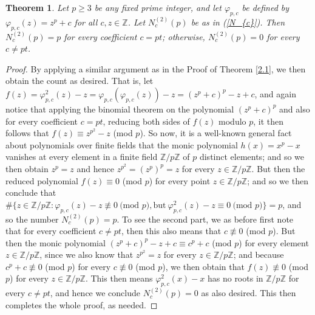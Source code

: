 \documentclass{article}
\theoremstyle{plain}
\newtheorem{thm}{Theorem}[section]
\theoremstyle{definition}
\begin{document}
\begin{thm} \label{2.2}
Let $p\geq 3$ be any fixed prime integer, and let $\varphi_{p, c}$ be defined by $\varphi_{p, c}(z) = z^p+c$ for all $c, z\in\mathbb{Z}$. Let $N_{c}^{(2)}(p)$ be as in \textnormal{(\ref{N_{c}})}. Then $N_{c}^{(2)}(p)=p$ for every coefficient $c = pt$; otherwise, $N_{c}^{(2)}(p) = 0$ for every $c \neq  pt$.
\end{thm}
\begin{proof}
By applying a similar argument as in the Proof of Theorem \ref{2.1}, we then obtain the count as desired. That is, let $f(z)= \varphi_{p, c}^2(z)-z = \varphi_{p,c}(\varphi_{p,c}(z))-z = (z^p+c)^p - z + c$, and again notice that applying the binomial theorem on the polynomial $(z^p + c)^p$ and also for every coefficient $c = pt$, reducing both sides of $f(z)$ modulo $p$, it then follows that $f(z)\equiv z^{p^2} - z$ (mod $p$). So now, it is a well-known general fact about polynomials over finite fields that the monic polynomial $h(x)= x^p - x$ vanishes at every element in a finite field $\mathbb{Z}\slash p\mathbb{Z}$ of $p$ distinct elements; and so we then obtain $z^p = z$ and hence $z^{p^2} = (z^p)^p = z$ for every $z\in \mathbb{Z}\slash p\mathbb{Z}$. But then the reduced polynomial $f(z)\equiv 0$ (mod $p$) for every point $z\in \mathbb{Z}\slash p\mathbb{Z}$; and so we then conclude that $\#\{ z\in \mathbb{Z} / p\mathbb{Z}: \varphi_{p,c}(z) -z \not \equiv 0 \ \text{(mod $p$)},\text{but} \ \varphi_{p,c}^2(z) - z \equiv 0 \ \text{(mod $p$)}\} =p$, and so the number $N_{c}^{(2)}(p)=p$. To see the second part, we as before first note that for every coefficient $c\neq pt$, then this also means that $c\not \equiv 0$ (mod $p$). But then the monic polynomial $(z^p+c)^p - z + c\equiv c^p + c$ (mod $p$) for every element $z\in \mathbb{Z} / p\mathbb{Z}$, since we also know that $z^{p^2} = z$ for every $z\in \mathbb{Z}\slash p\mathbb{Z}$; and because $c^p + c \not \equiv 0$ (mod $p$) for every $c\not \equiv 0$ (mod $p$), we then obtain that $f(z)\not \equiv 0$ (mod $p$) for every $z\in \mathbb{Z} / p\mathbb{Z}$. This then means $\varphi_{p,c}^2(x)-x$ has no roots in $\mathbb{Z} / p\mathbb{Z}$ for every $c\neq pt$, and hence we conclude $N_{c}^{(2)}(p) = 0$ as also desired. This then completes the whole proof, as needed.
\end{proof}
\end{document}
